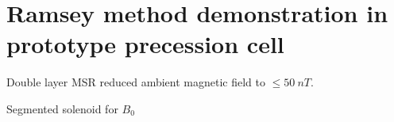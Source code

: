 
\chapter{Ramsey method demonstration in prototype precession cell}\label{chap:lanl_ramsey_demonstration}


Double layer MSR reduced ambient magnetic field to $\leq \qty{50}{nT}$.

Segmented solenoid for $B_0$